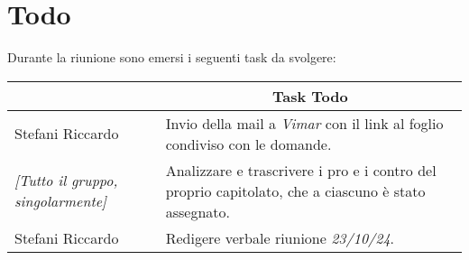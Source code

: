 \section{Todo}

Durante la riunione sono emersi i seguenti task da svolgere:

\vspace{0.5cm}

\begin{table}[htbp]
\begin{tabular}{|p{}|p{}|}
    \hline
    \rowcolor[gray]{0.9}
    \multicolumn{1}{|c|}{\textbf{Assegnatario}} & \multicolumn{1}{|c|}{\textbf{Task Todo}} \\
    \hline
    Stefani Riccardo & Invio della mail a \emph{Vimar} con il link al foglio condiviso con le domande. \\
    \hline
    \emph{[Tutto il gruppo, singolarmente]} & Analizzare e trascrivere i pro e i contro del proprio capitolato, che a ciascuno è stato assegnato. \\
    \hline
    Stefani Riccardo & Redigere verbale riunione \emph{23/10/24}. \\
    \hline
\end{tabular}
\end{table}
